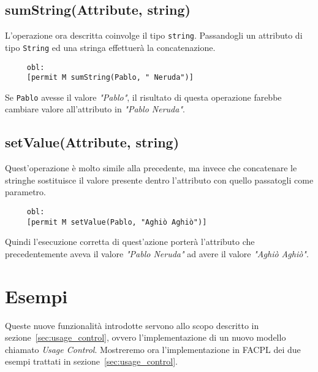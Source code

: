 \subsection*{sumString(Attribute, string)}
\label{ssub:opsumstring}

L'operazione ora descritta coinvolge il tipo \texttt{string}. Passandogli un attributo
di tipo \texttt{String} ed una stringa effettuerà la concatenazione.
\begin{verbatim}
	 obl:
     [permit M sumString(Pablo, " Neruda")]
\end{verbatim}
Se \texttt{Pablo} avesse il valore \textit{"Pablo"}, il risultato di questa operazione farebbe cambiare valore all'attributo in \textit{"Pablo Neruda"}.

\subsection*{setValue(Attribute, string)}
\label{ssub:opsetvalue}

Quest'operazione è molto simile alla precedente, ma invece che concatenare le stringhe sostituisce il valore presente dentro l'attributo con quello passatogli come parametro.
\begin{verbatim}
	 obl:
     [permit M setValue(Pablo, "Aghiò Aghiò")]
\end{verbatim}
Quindi l'esecuzione corretta di quest'azione porterà l'attributo che precedentemente aveva il valore 
\textit{"Pablo Neruda"} ad avere il valore \textit{"Aghiò Aghiò"}.


\section{Esempi} %
\label{sec:esempi}

Queste nuove funzionalità introdotte servono allo scopo descritto in sezione~\ref{sec:usage_control}, ovvero l'implementazione di un nuovo modello chiamato \textit{Usage Control}.
Mostreremo ora l'implementazione in FACPL dei due esempi trattati in sezione~\ref{sec:usage_control}. 

